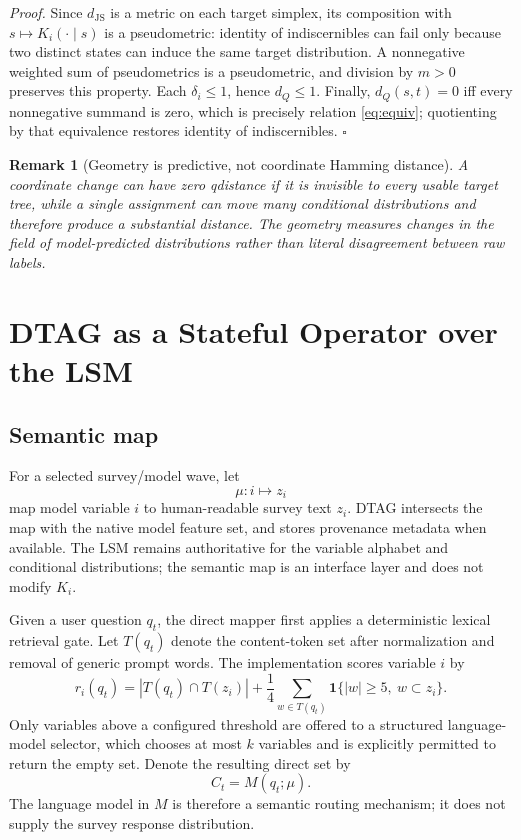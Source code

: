\documentclass[journal]{IEEEtran}
\newtheorem{remark}{Remark}
\newcommand{\1}{\mathbf{1}}
\begin{document}
\emph{Proof.} Since $d_{\mathrm{JS}}$ is a metric on each target simplex, its composition with $s\mapsto K_i(\cdot\mid s)$ is a pseudometric: identity of indiscernibles can fail only because two distinct states can induce the same target distribution. A nonnegative weighted sum of pseudometrics is a pseudometric, and division by $m>0$ preserves this property. Each $\delta_i\le1$, hence $d_Q\le1$. Finally, $d_Q(s,t)=0$ iff every nonnegative summand is zero, which is precisely relation \eqref{eq:equiv}; quotienting by that equivalence restores identity of indiscernibles. $\square$

\begin{remark}[Geometry is predictive, not coordinate Hamming distance]
A coordinate change can have zero qdistance if it is invisible to every usable target tree, while a single assignment can move many conditional distributions and therefore produce a substantial distance. The geometry measures changes in the field of model-predicted distributions rather than literal disagreement between raw labels.
\end{remark}

\section{DTAG as a Stateful Operator over the LSM}
\label{sec:dtag}

\subsection{Semantic map}

For a selected survey/model wave, let
\begin{equation}
  \mu:i\mapsto z_i
\end{equation}
map model variable $i$ to human-readable survey text $z_i$. DTAG intersects the map with the native model feature set, and stores provenance metadata when available. The LSM remains authoritative for the variable alphabet and conditional distributions; the semantic map is an interface layer and does not modify $K_i$.

Given a user question $q_t$, the direct mapper first applies a deterministic lexical retrieval gate. Let $T(q_t)$ denote the content-token set after normalization and removal of generic prompt words. The implementation scores variable $i$ by
\begin{equation}
  r_i(q_t)=|T(q_t)\cap T(z_i)|
  +\frac{1}{4}\sum_{w\in T(q_t)}\1\{|w|\ge5,\ w\subset z_i\}.
  \label{eq:lexscore}
\end{equation}
Only variables above a configured threshold are offered to a structured language-model selector, which chooses at most $k$ variables and is explicitly permitted to return the empty set. Denote the resulting direct set by
\begin{equation}
  C_t=M(q_t;\mu).
  \label{eq:directmap}
\end{equation}
The language model in $M$ is therefore a semantic routing mechanism; it does not supply the survey response distribution.
\end{document}
